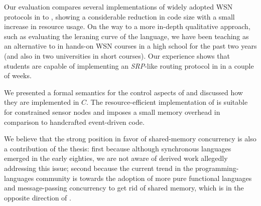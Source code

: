 Our evaluation compares several implementations of widely adopted WSN protocols 
in \CEU to \nesc, showing a considerable reduction in code size with a small 
increase in resource usage.
%
On the way to a more in-depth qualitative approach, such as evaluating the 
leraning curve of the language, we have been teaching \CEU as an alternative to 
\nesc in hands-on WSN courses in a high school for the past two years (and also 
in two universities in short courses).
Our experience shows that students are capable of implementing an 
\emph{SRP}-like routing protocol in \CEU in a couple of weeks.

We presented a formal semantics for the control aspects of \CEU and discussed 
how they are implemented in $C$.
%
The resource-efficient implementation of \CEU is suitable for constrained 
sensor nodes and imposes a small memory overhead in comparison to handcrafted 
event-driven code.

We believe that the strong position in favor of shared-memory concurrency is 
also a contribution of the thesis:
%
first because although synchronous languages emerged in the early eighties, we 
are not aware of derived work allegedly addressing this issue;
%
second because the current trend in the programming-languages community is 
towards the adoption of more pure functional languages and message-passing 
concurrency to get rid of shared memory, which is in the opposite direction of 
\CEU.

